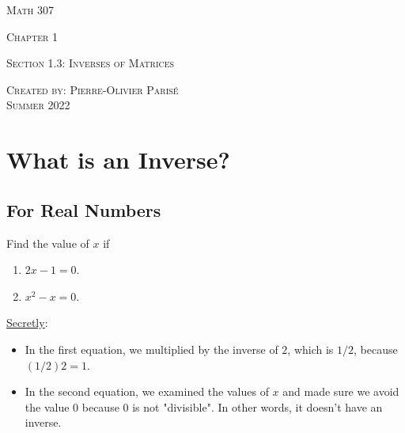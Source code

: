 \documentclass[12pt,a4paper]{article}
\newcounter{example}[section]
\begin{document}
\thispagestyle{empty}

\begin{center}
\vspace*{2.5cm}

{\Huge \textsc{Math 307}}

\vspace*{2cm}

{\LARGE \textsc{Chapter 1}} 

\vspace*{0.75cm}

\noindent\textsc{Section 1.3: Inverses of Matrices}

\vspace*{0.75cm}

\tableofcontents

\vfill

\noindent \textsc{Created by: Pierre-Olivier Paris{\'e}} \\
\textsc{Summer 2022}
\end{center}

\newpage

\setlength{\parindent}{0pt}

\section{What is an Inverse?}

\subsection{For Real Numbers}
\begin{example}
Find the value of $x$ if
	\begin{enumerate}
	\item $2x - 1 = 0$.
	\item $x^2 - x = 0$.
	\end{enumerate}
\end{example}

\vspace*{3cm}

\noindent\underline{Secretly}:
	\begin{itemize}
	\item In the first equation, we multiplied by the inverse of $2$, which is $1/2$, because $(1/2) 2 = 1$.
	\item In the second equation, we examined the values of $x$ and made sure we avoid the value $0$ because $0$ is not "divisible". In other words, it doesn't have an inverse.
	\end{itemize}
\end{document}
